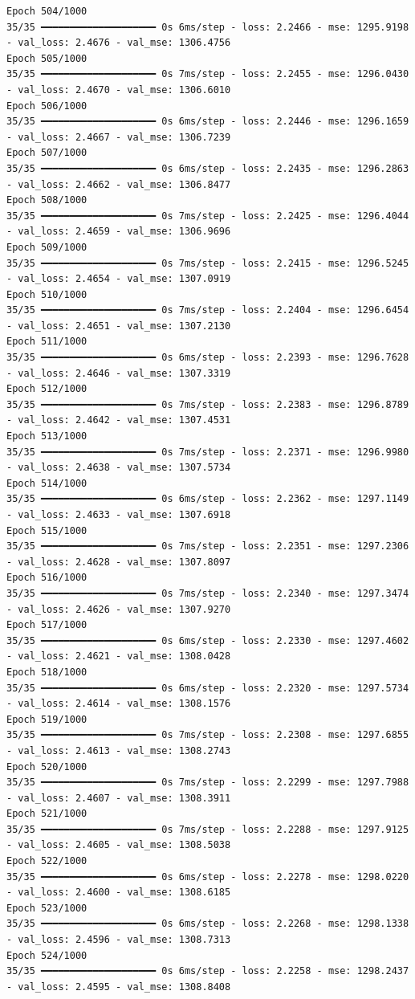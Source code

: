 \documentclass[
  letterpaper,
  DIV=11,
  numbers=noendperiod]{scrreprt}
\begin{document}
\begin{verbatim}
Epoch 504/1000
35/35 ━━━━━━━━━━━━━━━━━━━━ 0s 6ms/step - loss: 2.2466 - mse: 1295.9198 - val_loss: 2.4676 - val_mse: 1306.4756
Epoch 505/1000
35/35 ━━━━━━━━━━━━━━━━━━━━ 0s 7ms/step - loss: 2.2455 - mse: 1296.0430 - val_loss: 2.4670 - val_mse: 1306.6010
Epoch 506/1000
35/35 ━━━━━━━━━━━━━━━━━━━━ 0s 6ms/step - loss: 2.2446 - mse: 1296.1659 - val_loss: 2.4667 - val_mse: 1306.7239
Epoch 507/1000
35/35 ━━━━━━━━━━━━━━━━━━━━ 0s 6ms/step - loss: 2.2435 - mse: 1296.2863 - val_loss: 2.4662 - val_mse: 1306.8477
Epoch 508/1000
35/35 ━━━━━━━━━━━━━━━━━━━━ 0s 7ms/step - loss: 2.2425 - mse: 1296.4044 - val_loss: 2.4659 - val_mse: 1306.9696
Epoch 509/1000
35/35 ━━━━━━━━━━━━━━━━━━━━ 0s 7ms/step - loss: 2.2415 - mse: 1296.5245 - val_loss: 2.4654 - val_mse: 1307.0919
Epoch 510/1000
35/35 ━━━━━━━━━━━━━━━━━━━━ 0s 7ms/step - loss: 2.2404 - mse: 1296.6454 - val_loss: 2.4651 - val_mse: 1307.2130
Epoch 511/1000
35/35 ━━━━━━━━━━━━━━━━━━━━ 0s 6ms/step - loss: 2.2393 - mse: 1296.7628 - val_loss: 2.4646 - val_mse: 1307.3319
Epoch 512/1000
35/35 ━━━━━━━━━━━━━━━━━━━━ 0s 7ms/step - loss: 2.2383 - mse: 1296.8789 - val_loss: 2.4642 - val_mse: 1307.4531
Epoch 513/1000
35/35 ━━━━━━━━━━━━━━━━━━━━ 0s 7ms/step - loss: 2.2371 - mse: 1296.9980 - val_loss: 2.4638 - val_mse: 1307.5734
Epoch 514/1000
35/35 ━━━━━━━━━━━━━━━━━━━━ 0s 6ms/step - loss: 2.2362 - mse: 1297.1149 - val_loss: 2.4633 - val_mse: 1307.6918
Epoch 515/1000
35/35 ━━━━━━━━━━━━━━━━━━━━ 0s 7ms/step - loss: 2.2351 - mse: 1297.2306 - val_loss: 2.4628 - val_mse: 1307.8097
Epoch 516/1000
35/35 ━━━━━━━━━━━━━━━━━━━━ 0s 7ms/step - loss: 2.2340 - mse: 1297.3474 - val_loss: 2.4626 - val_mse: 1307.9270
Epoch 517/1000
35/35 ━━━━━━━━━━━━━━━━━━━━ 0s 6ms/step - loss: 2.2330 - mse: 1297.4602 - val_loss: 2.4621 - val_mse: 1308.0428
Epoch 518/1000
35/35 ━━━━━━━━━━━━━━━━━━━━ 0s 6ms/step - loss: 2.2320 - mse: 1297.5734 - val_loss: 2.4614 - val_mse: 1308.1576
Epoch 519/1000
35/35 ━━━━━━━━━━━━━━━━━━━━ 0s 7ms/step - loss: 2.2308 - mse: 1297.6855 - val_loss: 2.4613 - val_mse: 1308.2743
Epoch 520/1000
35/35 ━━━━━━━━━━━━━━━━━━━━ 0s 7ms/step - loss: 2.2299 - mse: 1297.7988 - val_loss: 2.4607 - val_mse: 1308.3911
Epoch 521/1000
35/35 ━━━━━━━━━━━━━━━━━━━━ 0s 7ms/step - loss: 2.2288 - mse: 1297.9125 - val_loss: 2.4605 - val_mse: 1308.5038
Epoch 522/1000
35/35 ━━━━━━━━━━━━━━━━━━━━ 0s 6ms/step - loss: 2.2278 - mse: 1298.0220 - val_loss: 2.4600 - val_mse: 1308.6185
Epoch 523/1000
35/35 ━━━━━━━━━━━━━━━━━━━━ 0s 6ms/step - loss: 2.2268 - mse: 1298.1338 - val_loss: 2.4596 - val_mse: 1308.7313
Epoch 524/1000
35/35 ━━━━━━━━━━━━━━━━━━━━ 0s 6ms/step - loss: 2.2258 - mse: 1298.2437 - val_loss: 2.4595 - val_mse: 1308.8408

\end{verbatim}
\end{document}
